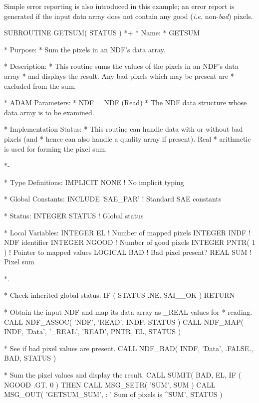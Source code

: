 \documentclass[twoside,11pt,nolof]{starlink}
\providecommand{\st}[1]{{\emph{#1}}}
\begin{document}
Simple error reporting is also introduced in this example; an error report is
generated if the input data array does not contain any good (\st{i.e.\/}
non-\st{bad\/}) pixels.

\small
\begin{terminalv}
      SUBROUTINE GETSUM( STATUS )
*+
*  Name:
*     GETSUM

*  Purpose:
*     Sum the pixels in an NDF's data array.

*  Description:
*     This routine sums the values of the pixels in an NDF's data array
*     and displays the result. Any bad pixels which may be present are
*     excluded from the sum.

*  ADAM Parameters:
*     NDF = NDF (Read)
*        The NDF data structure whose data array is to be examined.

*  Implementation Status:
*     This routine can handle data with or without bad pixels (and
*     hence can also handle a quality array if present). Real
*     arithmetic is used for forming the pixel sum.

*-

*  Type Definitions:
      IMPLICIT NONE              ! No implicit typing

*  Global Constants:
      INCLUDE 'SAE_PAR'          ! Standard SAE constants

*  Status:
      INTEGER STATUS             ! Global status

*  Local Variables:
      INTEGER EL                 ! Number of mapped pixels
      INTEGER INDF               ! NDF identifier
      INTEGER NGOOD              ! Number of good pixels
      INTEGER PNTR( 1 )          ! Pointer to mapped values
      LOGICAL BAD                ! Bad pixel present?
      REAL SUM                   ! Pixel sum

*.

*  Check inherited global status.
      IF ( STATUS .NE. SAI__OK ) RETURN

*  Obtain the input NDF and map its data array as _REAL values for
*  reading.
      CALL NDF_ASSOC( 'NDF', 'READ', INDF, STATUS )
      CALL NDF_MAP( INDF, 'Data', '_REAL', 'READ', PNTR, EL, STATUS )

*  See if bad pixel values are present.
      CALL NDF_BAD( INDF, 'Data', .FALSE., BAD, STATUS )

*  Sum the pixel values and display the result.
      CALL SUMIT( BAD, EL, %
      IF ( NGOOD .GT. 0 ) THEN
         CALL MSG_SETR( 'SUM', SUM )
         CALL MSG_OUT( 'GETSUM_SUM',
     :                 '   Sum of pixels is ^SUM', STATUS )


\end{terminalv}
\end{document}
